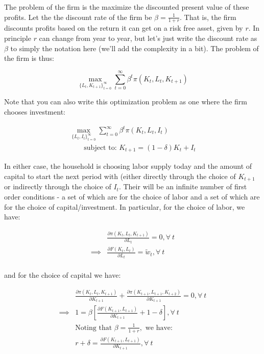 \documentclass[letterpaper,12pt]{article}
\theoremstyle{definition}
\begin{document}
\begin{spacing}{1.5}
The problem of the firm is the maximize the discounted present value of these profits.  Let the the discount rate of the firm be $\beta=\frac{1}{1+r}$.  That is, the firm discounts profits based on the return it can get on a risk free asset, given by $r$.  In principle $r$ can change from year to year, but let's just write the discount rate as $\beta$ to simply the notation here (we'll add the complexity in a bit).  The problem of the firm is thus:

\begin{equation}
\label{eqn:firm_seq_prob}
\max_{\{L_{t},K_{t+1}\}^{\infty}_{t=0}} \sum_{t=0}^{\infty} \beta^{t}\pi(K_{t},L_{t},K_{t+1})
\end{equation}

Note that you can also write this optimization problem as one where the firm chooses investment:

\begin{equation}
\label{eqn:firm_seq_prob2}
\begin{split}
\max_{\{L_{t},I_{t}\}^{\infty}_{t=0}} \sum_{t=0}^{\infty} \beta^{t}\pi(K_{t},L_{t},I_{t}) \\
\quad\quad \text{subject to: } K_{t+1} = (1-\delta)K_{t} + I_{t} 
\end{split}
\end{equation}

In either case, the household is choosing labor supply today and the amount of capital to start the next period with (either directly through the choice of $K_{t+1}$ or indirectly through the choice of $I_{t}$.  Their will be an infinite number of first order conditions - a set of which are for the choice of labor and a set of which are for the choice of capital/investment.  In particular, for the choice of labor, we have:

\begin{equation}
\label{eqn:dyn_firm_foc_l}
\begin{split}
&\frac{\partial \pi(K_{t},L_{t},K_{t+1})}{\partial L_{t}} = 0, \forall \ t \\
 \implies & \frac{\partial F(K_{t}, L_{t})}{\partial L_{t}} = \tilde{w}_{t}, \forall \ t \\
\end{split}
\end{equation}

and for the choice of capital we have:

\begin{equation}
\label{eqn:dyn_firm_foc_k}
\begin{split}
&\frac{\partial \pi(K_{t},L_{t},K_{t+1})}{\partial K_{t+1}} + \frac{\partial \pi(K_{t+1},L_{t+1},K_{t+2})}{\partial K_{t+1}} = 0, \forall \ t \\
 \implies & 1 = \beta \left[ \frac{\partial F(K_{t+1}, L_{t+1})}{\partial K_{t+1}}  + 1 - \delta\right], \forall \ t \\
 & \text{Noting that } \beta= \frac{1}{1+r}, \text{ we have: } \\
  & r+\delta =  \frac{\partial F(K_{t+1}, L_{t+1})}{\partial K_{t+1}} , \forall \ t 
\end{split}
\end{equation}


\end{spacing}
\end{document}
